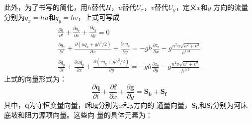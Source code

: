 此外，为了书写的简化，用$h$替代$H$，$u$替代$U_{x}$，$v$替代$U_{y}$，定义$x$和$y$
方向的流量分别为$q_{x}=hu$和$q_{y}=hv$，上式可写成
\begin{equation}
  \begin{gathered}
  \frac{\partial h}{\partial t} +
  \frac{\partial q_{x}}{\partial x} +
  \frac{\partial q_{y}}{\partial y}
  =
  0
    \\
  \frac{\partial q_{x}}{\partial t} +
  \frac{\partial (uq_{x}+gh^{2}/2)}{\partial x} +
  \frac{\partial vq_{y}}{\partial y} 
  =
  -gh\frac{\partial z_{b}}{\partial x}
  -g\frac{n^{2}u\sqrt{u^{2}+v^{2}}}{h^{1/3}}
    \\
  \frac{\partial q_{y}}{\partial t} +
  \frac{\partial uq_{y}}{\partial x} +
  \frac{\partial (vq_{y}+gh^{2}/2)}{\partial y} 
  =
  -gh\frac{\partial z_{b}}{\partial y}
  -g\frac{n^{2}v\sqrt{u^{2}+v^{2}}}{h^{1/3}}
  \end{gathered}
\end{equation}
上式的向量形式为：
\begin{equation}
  \frac{\partial \mathbf{q}}{\partial t} +
  \frac{\partial \mathbf{f}}{\partial x} +
  \frac{\partial \mathbf{g}}{\partial y}
  =
  \mathbf{S_{b}} + \mathbf{S_{f}}
\end{equation}
其中，$\mathbf{q}$为守恒变量向量，$\mathbf{f}$和$\mathbf{g}$分别为$x$和$y$方向的
通量向量，$\mathbf{S_{b}}$和$\mathbf{S_{f}}$分别为河床底坡和阻力源项向量。这些向
量的具体元素为：
